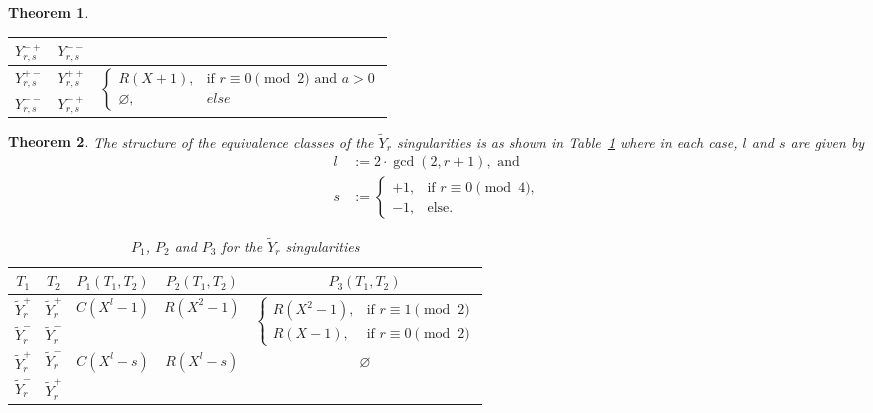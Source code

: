 \documentclass[noend]{amsproc}
\newtheorem{theorem}{Theorem}
\theoremstyle{definition}
\newcommand{\tY}{\widetilde{Y}}
\begin{document}
\begin{theorem}
\begin{table}[htb]
\begin{tabular}{|c|c||c|}
$Y_{r,s}^{-+}$ & $Y_{r,s}^{--}$ &
\\ \hline

$Y_{r,s}^{+-}$ & $Y_{r,s}^{++}$ &
\multirow{2}{*}{$\begin{cases}
  R(X+1),      &\!\text{if } r \equiv 0 \pmod{2} \text{ and } a > 0 \\
  \varnothing, &else
\end{cases}$}
\\ \cline{1-2}

$Y_{r,s}^{--}$ & $Y_{r,s}^{-+}$ &
\\ \hline

\end{tabular}
\end{table}

\end{theorem}


\begin{theorem}
The structure of the equivalence classes of the $\tY_r$ singularities is as
shown in Table~\ref{tab:tYr_equivalences} where in each case, $l$ and $s$ are
given by
\begin{align*}
l &:= 2\cdot{\gcd(2, r+1)}, \text{ and} \\
s &:=
\begin{cases}
  +1,  &\text{if } r \equiv 0 \pmod{4}, \\
  -1, &\text{else.}
\end{cases}
\end{align*}

\begin{table}[htb]
\centering
\caption{$P_1$, $P_2$ and $P_3$ for the $\tY_r$ singularities}
\label{tab:tYr_equivalences}
\begin{tabular}{|c|c||c|c|c|}
\hline

$T_1$ & $T_2$ & $P_1(T_1, T_2)$ & $P_2(T_1, T_2)$ & $P_3(T_1, T_2)$ \\
\hline\hline

$\tY_r^+$ & $\tY_r^+$ &
\multirow{2}{*}{$C(X^l-1)$} &
\multirow{2}{*}{$R(X^2-1)$} &
\multirow{2}{*}{$\begin{cases}
  R(X^2-1), &\text{if } r \equiv 1 \pmod{2} \\
  R(X-1),   &\text{if } r \equiv 0 \pmod{2}
\end{cases}$} \\
\cline{1-2}

$\tY_r^-$ & $\tY_r^-$ &
&
&
\\
\hline

$\tY_r^+$ & $\tY_r^-$ &
\multirow{2}{*}{$C(X^l-s)$} &
\multirow{2}{*}{$R(X^l-s)$} &
\multirow{2}{*}{$\varnothing$} \\
\cline{1-2}

$\tY_r^-$ & $\tY_r^+$ &
&
&
\\
\hline

\end{tabular}
\end{table}

\end{theorem}
\end{document}
